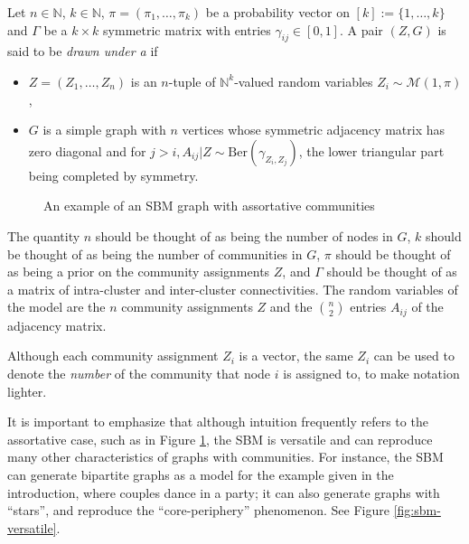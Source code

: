 \documentclass[../../main.tex]{subfiles} %
\begin{document}
\begin{definition} \label{def:sbm}
	Let \(n \in \mathbb N\), \(k \in \mathbb N\), \(\pi = (\pi_1, \dots, 
	\pi_k)\) be a probability vector on \([k] := \{1, \dots, k\}\) and  
	\(\Gamma\) be a \(k \times k\) symmetric matrix with entries \(\gamma_{ij} 
	\in [0, 1]\). A pair \((Z, G)\) is said to be \textit{drawn under a 
		} if 
	\begin{itemize}
		\item \(Z = (Z_1, \dots, Z_n)\) is an \(n\)-tuple of \(\mathbb 
		N^k\)-valued random variables \(Z_i \sim \mathcal M (1, \pi)\),
		\item \(G\) is a simple graph with \(n\) vertices whose symmetric 
		adjacency matrix has zero diagonal and for \(j > i, A_{ij} \vert Z \sim 
		\text{Ber}(\gamma_{Z_i, Z_j})\), the lower triangular part being 
		completed by symmetry.
	\end{itemize}
\end{definition}

\begin{figure}[ht]
	\centering
	\caption{An example of an SBM graph with assortative communities}
	\label{fig:sbm-example}
\end{figure}

\begin{remark}
	The quantity \(n\) should be thought of as being the number of nodes in 
	\(G\), \(k\) should be thought of as being the number of communities in 
	\(G\), \(\pi\) should be thought of as being a prior on the community 
	assignments \(Z\), and \(\Gamma\) should be thought of as a matrix of 
	intra-cluster and inter-cluster connectivities. The random variables of the 
	model are the \(n\) community assignments \(Z\) and the \(\binom{n}{2}\) 
	entries \(A_{ij}\) of the adjacency matrix.
\end{remark}

\begin{remark}
	Although each community assignment \(Z_i\) is a vector, the same \(Z_i\) 
	can be used to denote the \textit{number} of the community that node \(i\) 
	is assigned to, to make notation lighter.
\end{remark}

It is important to emphasize that although intuition frequently refers to the 
assortative case, such as in Figure \ref{fig:sbm-example}, the SBM is versatile 
and can reproduce many other characteristics of graphs with communities. For 
instance, the SBM can generate bipartite graphs as a model for the example 
given in the introduction, where couples dance in a party; it can also generate 
graphs with ``stars'', and reproduce the ``core-periphery'' phenomenon. See 
Figure \ref{fig:sbm-versatile}.
\end{document}
